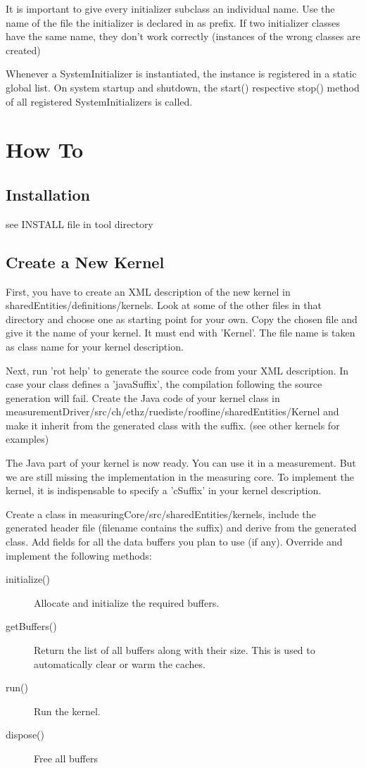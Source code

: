 \documentclass[a4paper,12pt]{article}
\newcommand{\method}[1]{\textsf{#1}}
\begin{document}
It is important to give every initializer subclass an individual name. Use the
name of the file the initializer is declared in as prefix. If two initializer
classes have the same name, they don't work correctly (instances of the wrong
classes are created)

Whenever a SystemInitializer is instantiated, the instance is registered in a
static global list. On system startup and shutdown, the start() respective
stop() method of all registered SystemInitializers is called.

\section{How To}
\subsection{Installation}
see INSTALL file in tool directory

\subsection{Create a New Kernel}
First, you have to create an XML description of the new kernel in
sharedEntities/definitions/kernels. Look at some of the other files in that
directory and choose one as starting point for your own. Copy the chosen file
and give it the name of your kernel. It must end with 'Kernel'. The file name is
taken as class name for your kernel description.

Next, run 'rot help' to generate the source code from your XML description. In
case your class defines a 'javaSuffix', the compilation following the source
generation will fail. Create the Java code of your kernel class in
measurementDriver/src/ch/ethz/ruediste/roofline/sharedEntities/Kernel and make
it inherit from the generated class with the suffix. (see other kernels for
examples)

The Java part of your kernel is now ready. You can use it in a measurement. But
we are still missing the implementation in the measuring core. To implement the
kernel, it is indispensable to specify a 'cSuffix' in your kernel description.

Create a class in measuringCore/src/sharedEntities/kernels, include the
generated header file (filename contains the suffix) and derive from the
generated class. Add fields for all the data buffers you plan to use
(if any). Override and implement the following methods:
\begin{description}
\item[\method{initialize()}] Allocate and initialize the required buffers.
\item[\method{getBuffers()}] Return the list of all buffers along with their
size. This is used to automatically clear or warm the caches.
\item[\method{run()}] Run the kernel.
\item[\method{dispose()}] Free all buffers
\end{description}
\end{document}
